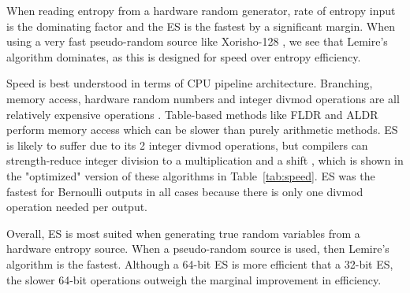 \documentclass[lettersize,journal]{IEEEtran}
\begin{document}
When reading entropy from a hardware random generator, rate of entropy input is the dominating factor and the ES is the fastest by a significant margin. When using a very fast pseudo-random source like Xorisho-128 \cite{blackman21}, we see that Lemire's algorithm \cite{lemire2019fast} dominates, as this is designed for speed over entropy efficiency.

Speed is best understood in terms of CPU pipeline architecture. Branching, memory access, hardware random numbers and integer divmod operations are all relatively expensive operations \cite{Abel19a}. Table-based methods like FLDR \cite{saad2020fldr} and ALDR \cite{saad2025} perform memory access which can be slower than purely arithmetic methods. ES is likely to suffer due to its 2 integer divmod operations, but compilers can strength-reduce integer division to a multiplication and a shift \cite{granlund94}, which is shown in the "optimized" version of these algorithms in Table~\ref{tab:speed}. ES was the fastest for Bernoulli outputs in all cases because there is only one divmod operation needed per output.

Overall, ES is most suited when generating true random variables from a hardware entropy source. When a pseudo-random source is used, then Lemire's algorithm is the fastest. Although a 64-bit ES is more efficient that a 32-bit ES, the slower 64-bit operations outweigh the marginal improvement in efficiency.
\end{document}
